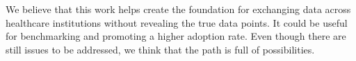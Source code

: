 We believe that this work helps create the foundation for exchanging data across healthcare institutions without revealing the true data points. It could be useful for benchmarking and promoting a higher adoption rate.
Even though there are still issues to be addressed, we think that the path is full of possibilities.